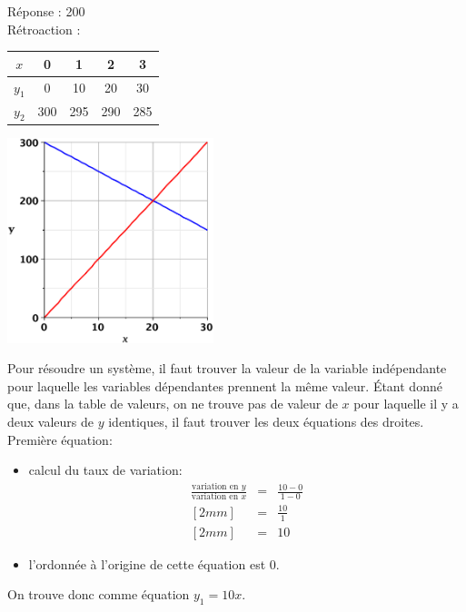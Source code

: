 \documentclass[letterpaper, 12pt]{article}
\begin{document}
R\'eponse : 200\\

R\'etroaction :
\begin{center}
 \begin{tabular}{|c||c| c | c | c | } \hline
{\bf $x$} & 0 & 1 & 2 & 3  \\ \hline
{\bf $y_{1}$} & 0 & 10 & 20 & 30  \\ \hline
{\bf $y_{2}$} & 300 & 295 & 290 & 285  \\ \hline
\end{tabular}
\end{center}
\begin{center}
 \includegraphics[width=6cm,bb=20 118 575 673]{Q2113.eps}
\end{center}
Pour r\'esoudre un syst\`eme, il faut trouver la valeur de la variable ind\'ependante pour laquelle les variables d\'ependantes prennent la m\^eme valeur. \'Etant donn\'e que, dans la table de valeurs, on ne trouve pas de valeur de $x$ pour laquelle il y a deux valeurs de $y$ identiques, il faut trouver les deux \'equations des droites.\\

Premi\`ere \'equation:
\begin{itemize}
 \item calcul du taux de variation:
\begin{eqnarray*}
 \frac{\textrm{variation en $y$}}{\textrm{variation en $x$}} &=& \frac{10-0}{1-0}\\ [2mm]
&=& \frac{10}{1}\\ [2mm]
&=& 10
\end{eqnarray*}
\item l'ordonn\'ee \`a l'origine de cette \'equation est 0.
\end{itemize}
On trouve donc comme \'equation $y_{1}=10x$.\\
\end{document}
